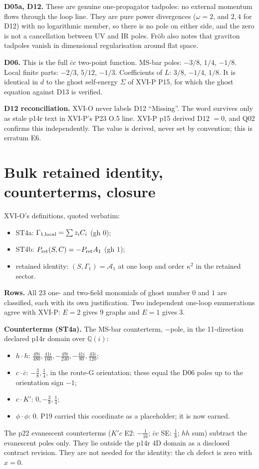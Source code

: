 \textbf{D05a, D12.} These are genuine one-propagator tadpoles: no external momentum flows through the loop line. They
are pure power divergences ($\omega=2$, and $2,4$ for D12) with no logarithmic member, so there is no pole on either
side, and the zero is not a cancellation between UV and IR poles. Fr\"ob also notes that graviton tadpoles vanish in
dimensional regularisation around flat space.

\textbf{D06.} This is the full $\bar c c$ two-point function. MS-bar poles: $-3/8$, $1/4$, $-1/8$. Local finite parts:
$-2/3$, $5/12$, $-1/3$. Coefficients of $L$: $3/8$, $-1/4$, $1/8$. It is identical in $d$ to the ghost self-energy
$\Sigma$ of XVI-P P15, for which the ghost equation against D13 is verified.

\textbf{D12 reconciliation.} XVI-O never labels D12 ``Missing''. The word survives only as stale p14r text in XVI-P's
P23 O.5 line. XVI-P p15 derived D12 $=0$, and Q02 confirms this independently. The value is derived, never set by
convention; this is erratum E6.

\section{Bulk retained identity, counterterms, closure}
XVI-O's definitions, quoted verbatim:
\begin{itemize}
\item ST4a: $\Gamma_{1,\rm local}=\sum z_iC_i$ (gh $0$);
\item ST4b: $P_{\rm ret}(S,C)=-P_{\rm ret}A_1$ (gh $1$);
\item retained identity: $(S,\Gamma_1)=\mathcal A_1$ at one loop and order $\kappa^2$ in the retained sector.
\end{itemize}

\textbf{Rows.} All 23 one- and two-field monomials of ghost number $0$ and $1$ are classified, each with its own
justification. Two independent one-loop enumerations agree with XVI-P: $E=2$ gives 9 graphs and $E=1$ gives 3.

\textbf{Counterterms (ST4a).} The MS-bar counterterm, $-$pole, in the 11-direction declared p14r domain over
$\mathbb Q(i)$:
\begin{itemize}
\item $h\!\cdot\!h$: $\tfrac{49i}{480},\tfrac{41i}{160},-\tfrac{49i}{240},-\tfrac{41i}{80},\tfrac{43i}{120}$;
\item $c\!\cdot\!\bar c$: $-\tfrac38,\tfrac14$, in the route-G orientation; these equal the D06 poles up to the
orientation sign $-1$;
\item $c\!\cdot\!K'$: $0,-\tfrac38,\tfrac14$;
\item $\phi\!\cdot\!\phi$: $0$. P19 carried this coordinate as a placeholder; it is now earned.
\end{itemize}
The p22 evanescent counterterms ($K'c$ E2: $-\tfrac1{16}$; $\bar cc$ SE: $\tfrac18$; $hh$ sum) subtract the evanescent
poles only. They lie outside the p14r 4D domain as a disclosed contract revision. They are not needed for the identity:
the ch defect is zero with $x=0$.

